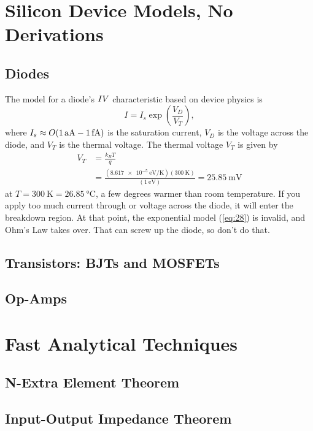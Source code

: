 \documentclass[12pt]{report}
\begin{document}
\section{Silicon Device Models, No Derivations}
\subsection{Diodes}
The model for a diode's $I \- V$ characteristic  based on device physics is
\begin{equation}
\label{eq:28}
I = I_{s} \exp \left( \frac{V_{D}}{V_{T}} \right),
\end{equation}
where $I_{s} \approx O(\SI{1}{aA} \-- \SI{1}{fA})$ is the saturation current, $V_{D}$ is the voltage across the diode, and $V_{T}$ is the thermal voltage. The thermal voltage $V_{T}$ is given by
\begin{equation}
  \begin{aligned}
\label{eq:29}
V_{T} &= \frac{k_{B} T}{q} \\ &= \frac{\left( \SI{8.617e-5}{\electronvolt \per \kelvin} \right) \left( \SI{300}{\kelvin} \right) }{ \left( \SI{1}{\electronvolt} \right) } = \SI{25.85}{\milli \volt}
\end{aligned}
\end{equation}
at $T = \SI{300}{\kelvin} = \SI{26.85}{\celsius}$, a few degrees warmer than room temperature. If you apply too much current through or voltage across the diode, it will enter the breakdown region. At that point, the exponential model (\ref{eq:28}) is invalid, and Ohm's Law takes over. That can screw up the diode, so don't do that.
\subsection{Transistors: BJTs and MOSFETs}

\subsection{Op-Amps}
\section{Fast Analytical Techniques}
\subsection{N-Extra Element Theorem}
\subsection{Input-Output Impedance Theorem}
\end{document}
